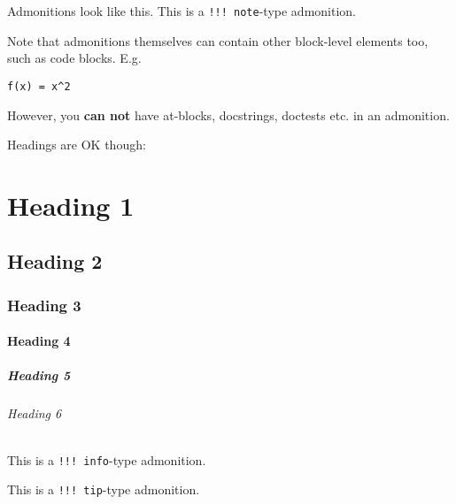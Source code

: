 \begin{tcolorbox}[toptitle=-1mm,bottomtitle=1mm,colback=admonition-note!50!white,colframe=admonition-note,title=\textbf{{\textquotesingle}note{\textquotesingle} admonition}]
Admonitions look like this. This is a \texttt{!!! note}-type admonition.

Note that admonitions themselves can contain other block-level elements too, such as code blocks. E.g.


\begin{lstlisting}[]
f(x) = x^2
\end{lstlisting}

However, you \textbf{can not} have at-blocks, docstrings, doctests etc. in an admonition.

Headings are OK though:

\chapter{Heading 1}

\section{Heading 2}

\subsection{Heading 3}

\subsubsection{Heading 4}

\paragraph{Heading 5}\indent

\subparagraph{Heading 6}\indent

\end{tcolorbox}


\begin{tcolorbox}[toptitle=-1mm,bottomtitle=1mm,colback=admonition-info!50!white,colframe=admonition-info,title=\textbf{{\textquotesingle}info{\textquotesingle} admonition}]
This is a \texttt{!!! info}-type admonition.

\end{tcolorbox}


\begin{tcolorbox}[toptitle=-1mm,bottomtitle=1mm,colback=admonition-tip!50!white,colframe=admonition-tip,title=\textbf{{\textquotesingle}tip{\textquotesingle} admonition}]
This is a \texttt{!!! tip}-type admonition.

\end{tcolorbox}


